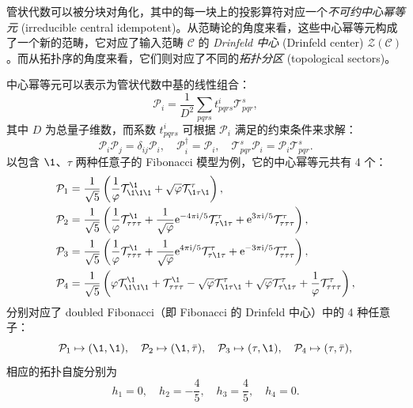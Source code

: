 管状代数可以被分块对角化，其中的每一块上的投影算符对应一个\emph{不可约中心幂等元} (irreducible central idempotent)。从范畴论的角度来看，这些中心幂等元构成了一个新的范畴，它对应了输入范畴 $\mathcal{C}$ 的 \emph{Drinfeld 中心} (Drinfeld center) $\mathcal{Z}(\mathcal{C})$。而从拓扑序的角度来看，它们则对应了不同的\emph{拓扑分区} (topological sectors)\cite{lan2014topological,bultinck2017anyons,williamson2017symmetry,vanhove2018mapping}。

中心幂等元可以表示为管状代数中基的线性组合：
\begin{equation}
  \mathcal{P}_{i} = \frac{1}{D^2} \sum_{pqrs} t^i_{pqrs} \mathcal{T}^{s}_{pqr},
\end{equation}
其中 $D$ 为总量子维数，而系数 $t^i_{pqrs}$ 可根据 $\mathcal{P}_{i}$ 满足的约束条件来求解：
\begin{equation}
  \mathcal{P}_{i} \mathcal{P}_{j} = \delta_{ij} \mathcal{P}_{i}, \quad
  \mathcal{P}_{i}^\dagger = \mathcal{P}_{i}, \quad
  \mathcal{T}^{s}_{pqr} \mathcal{P}_{i} = \mathcal{P}_{i} \mathcal{T}^{s}_{pqr}.
\end{equation}
以包含 $\1$、$\tau$ 两种任意子的 Fibonacci 模型为例\cite{bultinck2017anyons}，它的中心幂等元共有 4 个：
\begin{equation}
  \begin{aligned}
    \mathcal{P}_{1} &= \frac{1}{\sqrt5} \left(
      \frac{1}{\varphi} \mathcal{T}^{\1}_{\1\1\1} + \sqrt{\varphi} \mathcal{T}^{\tau}_{\1\tau\1}
    \right), \\
    \mathcal{P}_{2} &= \frac{1}{\sqrt5} \left(
      \frac{1}{\varphi} \mathcal{T}^{\1}_{\tau\tau\tau} + \frac{1}{\sqrt{\varphi}} \ee^{-4\pi\ii/5} \mathcal{T}^{\tau}_{\tau\1\tau} + \ee^{ 3\pi\ii/5} \mathcal{T}^{\tau}_{\tau\tau\tau}
    \right), \\
    \mathcal{P}_{3} &= \frac{1}{\sqrt5} \left(
      \frac{1}{\varphi} \mathcal{T}^{\1}_{\tau\tau\tau} + \frac{1}{\sqrt{\varphi}} \ee^{ 4\pi\ii/5} \mathcal{T}^{\tau}_{\tau\1\tau} + \ee^{-3\pi\ii/5} \mathcal{T}^{\tau}_{\tau\tau\tau}
    \right), \\
    \mathcal{P}_{4} &= \frac{1}{\sqrt5} \left(
      \varphi \mathcal{T}^{\1}_{\1\1\1} + \mathcal{T}^{\1}_{\tau\tau\tau} - \sqrt{\varphi} \mathcal{T}^{\tau}_{\1\tau\1} + \sqrt{\varphi} \mathcal{T}^{\tau}_{\tau\1\tau} + \frac{1}{\varphi} \mathcal{T}^{\tau}_{\tau\tau\tau}
    \right),
  \end{aligned}
  \label{eq:fib-idempotents}
\end{equation}
分别对应了 doubled Fibonacci（即 Fibonacci 的 Drinfeld 中心）中的 4 种任意子：
\begin{equation}
  \mathcal{P}_{1} \mapsto (\1, \1), \quad
  \mathcal{P}_{2} \mapsto (\1, \bar{\tau}), \quad
  \mathcal{P}_{3} \mapsto (\tau, \1), \quad
  \mathcal{P}_{4} \mapsto (\tau, \bar{\tau}),
\end{equation}
相应的拓扑自旋分别为
\begin{equation}
  h_1 = 0, \quad h_2 = -\frac45, \quad h_3 = \frac45, \quad h_4 = 0.
\end{equation}

